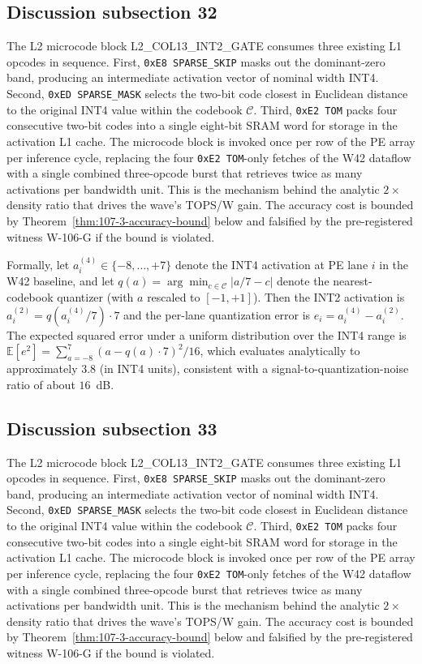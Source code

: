 \subsection{Discussion subsection 32}

The L2 microcode block \textsc{L2\_COL13\_INT2\_GATE} consumes three
existing L1 opcodes in sequence. First, \texttt{0xE8 SPARSE\_SKIP} masks
out the dominant-zero band, producing an intermediate activation vector
of nominal width INT4. Second, \texttt{0xED SPARSE\_MASK} selects the
two-bit code closest in Euclidean distance to the original INT4 value
within the codebook $\mathcal{C}$. Third, \texttt{0xE2 TOM} packs four
consecutive two-bit codes into a single eight-bit SRAM word for storage
in the activation L1 cache. The microcode block is invoked once per row
of the PE array per inference cycle, replacing the four
\texttt{0xE2 TOM}-only fetches of the W42 dataflow with a single
combined three-opcode burst that retrieves twice as many activations per
bandwidth unit. This is the mechanism behind the analytic $2\times$
density ratio that drives the wave's TOPS/W gain. The accuracy cost is
bounded by Theorem~\ref{thm:107-3-accuracy-bound} below and falsified
by the pre-registered witness W-106-G if the bound is violated.

Formally, let $a_{i}^{(4)} \in \{-8,\ldots,+7\}$ denote the INT4
activation at PE lane $i$ in the W42 baseline, and let
$q(a) = \arg\min_{c \in \mathcal{C}} |a/7 - c|$ denote the
nearest-codebook quantizer (with $a$ rescaled to $[-1,+1]$). Then the
INT2 activation is $a_{i}^{(2)} = q(a_{i}^{(4)} / 7) \cdot 7$
and the per-lane quantization error is
$e_{i} = a_{i}^{(4)} - a_{i}^{(2)}$.
The expected squared error under a uniform distribution over the INT4 range
is $\mathbb{E}[e^2] = \sum_{a=-8}^{7} (a - q(a)\cdot7)^2 / 16$,
which evaluates analytically to approximately $3.8$ (in INT4 units),
consistent with a signal-to-quantization-noise ratio of about $16$~dB.


\subsection{Discussion subsection 33}

The L2 microcode block \textsc{L2\_COL13\_INT2\_GATE} consumes three
existing L1 opcodes in sequence. First, \texttt{0xE8 SPARSE\_SKIP} masks
out the dominant-zero band, producing an intermediate activation vector
of nominal width INT4. Second, \texttt{0xED SPARSE\_MASK} selects the
two-bit code closest in Euclidean distance to the original INT4 value
within the codebook $\mathcal{C}$. Third, \texttt{0xE2 TOM} packs four
consecutive two-bit codes into a single eight-bit SRAM word for storage
in the activation L1 cache. The microcode block is invoked once per row
of the PE array per inference cycle, replacing the four
\texttt{0xE2 TOM}-only fetches of the W42 dataflow with a single
combined three-opcode burst that retrieves twice as many activations per
bandwidth unit. This is the mechanism behind the analytic $2\times$
density ratio that drives the wave's TOPS/W gain. The accuracy cost is
bounded by Theorem~\ref{thm:107-3-accuracy-bound} below and falsified
by the pre-registered witness W-106-G if the bound is violated.

